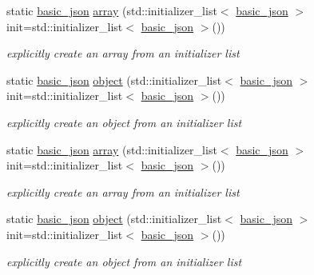 \begin{DoxyCompactItemize}
\item 
static \hyperlink{classnlohmann_1_1basic__json}{basic\-\_\-json} \hyperlink{classnlohmann_1_1basic__json_a5685815624b086caa532f41e853d4b0f}{array} (std\-::initializer\-\_\-list$<$ \hyperlink{classnlohmann_1_1basic__json}{basic\-\_\-json} $>$ init=std\-::initializer\-\_\-list$<$ \hyperlink{classnlohmann_1_1basic__json}{basic\-\_\-json} $>$())
\begin{DoxyCompactList}\small\item\em explicitly create an array from an initializer list \end{DoxyCompactList}\item 
static \hyperlink{classnlohmann_1_1basic__json}{basic\-\_\-json} \hyperlink{classnlohmann_1_1basic__json_ad25b2f8c21e241e2d63455537a9294ff}{object} (std\-::initializer\-\_\-list$<$ \hyperlink{classnlohmann_1_1basic__json}{basic\-\_\-json} $>$ init=std\-::initializer\-\_\-list$<$ \hyperlink{classnlohmann_1_1basic__json}{basic\-\_\-json} $>$())
\begin{DoxyCompactList}\small\item\em explicitly create an object from an initializer list \end{DoxyCompactList}\item 
static \hyperlink{classnlohmann_1_1basic__json}{basic\-\_\-json} \hyperlink{classnlohmann_1_1basic__json_a5685815624b086caa532f41e853d4b0f}{array} (std\-::initializer\-\_\-list$<$ \hyperlink{classnlohmann_1_1basic__json}{basic\-\_\-json} $>$ init=std\-::initializer\-\_\-list$<$ \hyperlink{classnlohmann_1_1basic__json}{basic\-\_\-json} $>$())
\begin{DoxyCompactList}\small\item\em explicitly create an array from an initializer list \end{DoxyCompactList}\item 
static \hyperlink{classnlohmann_1_1basic__json}{basic\-\_\-json} \hyperlink{classnlohmann_1_1basic__json_ad25b2f8c21e241e2d63455537a9294ff}{object} (std\-::initializer\-\_\-list$<$ \hyperlink{classnlohmann_1_1basic__json}{basic\-\_\-json} $>$ init=std\-::initializer\-\_\-list$<$ \hyperlink{classnlohmann_1_1basic__json}{basic\-\_\-json} $>$())
\begin{DoxyCompactList}\small\item\em explicitly create an object from an initializer list \end{DoxyCompactList}\item 

\end{DoxyCompactItemize}
